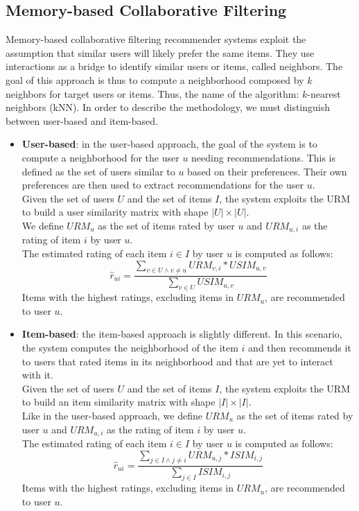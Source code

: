 \subsection{Memory-based Collaborative Filtering}

Memory-based collaborative filtering recommender systems \cite{10.1007/978-0-387-85820-3_1} exploit the assumption that similar users will likely prefer the same items. They use interactions as a bridge to identify similar users or items, called neighbors. The goal of this approach is thus to compute a neighborhood composed by $k$ neighbors for target users or items. Thus, the name of the algorithm: $k$-nearest neighbors (kNN). In order to describe the methodology, we must distinguish between user-based and item-based.
\begin{itemize}
\item \textbf{User-based}: in the user-based approach, the goal of the system is to compute a neighborhood for the user $u$ needing recommendations. This is defined as the set of users similar to $u$ based on their preferences. Their own preferences are then used to extract recommendations for the user $u$.\\
Given the set of users $U$ and the set of items $I$, the system exploits the URM to build a user similarity matrix with shape $|U| \times |U|$.\\
We define $URM_u$ as the set of items rated by user $u$ and $URM_{u,i}$ as the rating of item $i$ by user $u$.\\
The estimated rating of each item $i \in I$ by user $u$ is computed as follows:
\begin{equation*}
\hat{r}_{ui} = \frac{\sum_{v \in U \wedge v \neq u} URM_{v,i} * USIM_{u,v}}{\sum_{v \in U} USIM_{u,v}}
\end{equation*}
Items with the highest ratings, excluding items in $URM_u$, are recommended to user $u$.
\item \textbf{Item-based}: the item-based approach is slightly different. In this scenario, the system computes the neighborhood of the item $i$ and then recommends it to users that rated items in its neighborhood and that are yet to interact with it.\\
Given the set of users $U$ and the set of items $I$, the system exploits the URM to build an item similarity matrix with shape $|I| \times |I|$.\\
Like in the user-based approach, we define $URM_u$ as the set of items rated by user $u$ and $URM_{u,i}$ as the rating of item $i$ by user $u$.\\
The estimated rating of each item $i \in I$ by user $u$ is computed as follows:
\begin{equation*}
\hat{r}_{ui} = \frac{\sum_{j \in I \wedge j \neq i} URM_{u,j} * ISIM_{i,j}}{\sum_{j \in I} ISIM_{i,j}}
\end{equation*}
Items with the highest ratings, excluding items in $URM_u$, are recommended to user $u$.
\end{itemize}


